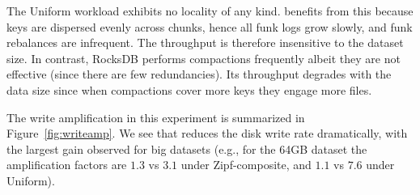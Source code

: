  
The Uniform workload exhibits no locality of any kind. 
 \sys\/ benefits from this because keys are dispersed evenly across chunks, hence all funk logs grow 
 slowly, and funk rebalances are infrequent. The throughput is therefore insensitive to the dataset 
 size. In contrast, RocksDB performs compactions frequently albeit they are not effective (since there are few redundancies). Its throughput 
 degrades  with the data size since when compactions cover more keys they engage more files.
 
   
The write amplification in this experiment is summarized in 
Figure~\ref{fig:writeamp}. We see that \sys\/ reduces the disk write rate dramatically, 
with the largest gain observed for big datasets (e.g.,  for the 64GB dataset 
the amplification factors are $1.3$ vs $3.1$ under Zipf-composite, and $1.1$ vs $7.6$ under Uniform). 



